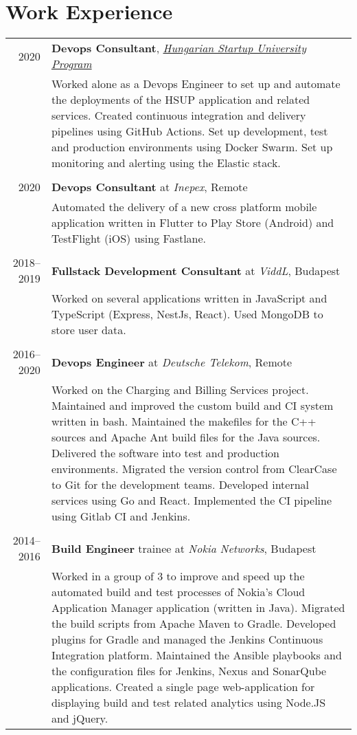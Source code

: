 \documentclass[a4paper,10pt]{article} %
\begin{document}
\section{Work Experience}
\begin{tabular}{r|p{12.5cm}}

\textsc{2020} & \textbf{Devops Consultant}, \href{https://hsup.nkfih.gov.hu}{\emph{Hungarian Startup University Program}} \\
& \footnotesize{Worked alone as a Devops Engineer to set up and automate the deployments of the HSUP application and related services. Created continuous integration and delivery pipelines using GitHub Actions. Set up development, test and production environments using Docker Swarm. Set up monitoring and alerting using the Elastic stack.}\\

\multicolumn{2}{c}{} \\
\textsc{2020} & \textbf{Devops Consultant} at \emph{Inepex}, Remote \\
& \footnotesize{Automated the delivery of a new cross platform mobile application written in Flutter to Play Store (Android) and TestFlight (iOS) using Fastlane.}\\

\multicolumn{2}{c}{} \\
\textsc{2018--2019} & \textbf{Fullstack Development Consultant} at \emph{ViddL}, Budapest \\
& \footnotesize{Worked on several applications written in JavaScript and TypeScript (Express, NestJs, React). Used MongoDB to store user data.}\\

\multicolumn{2}{c}{} \\
\textsc{2016--2020} & \textbf{Devops Engineer} at \emph{Deutsche Telekom}, Remote \\
& \footnotesize{Worked on the Charging and Billing Services project. Maintained and improved the custom build and CI system written in bash. Maintained the makefiles for the C++ sources and Apache Ant build files for the Java sources. Delivered the software into test and production environments. Migrated the version control from ClearCase to Git for the development teams}. Developed internal services using Go and React. Implemented the CI pipeline using Gitlab CI and Jenkins.\\

\multicolumn{2}{c}{} \\
\textsc{2014--2016} & \textbf{Build Engineer} trainee at \emph{Nokia Networks}, Budapest \\
& \footnotesize{Worked in a group of 3 to improve and speed up the automated build and test processes of Nokia’s Cloud Application Manager application (written in Java).
Migrated the build scripts from Apache Maven to Gradle. Developed plugins for Gradle and managed the Jenkins Continuous Integration platform. Maintained the Ansible playbooks and the configuration files for Jenkins, Nexus and SonarQube applications. Created a single page web-application for displaying build and test related analytics using Node.JS and jQuery.}\\

\end{tabular}
\end{document}
